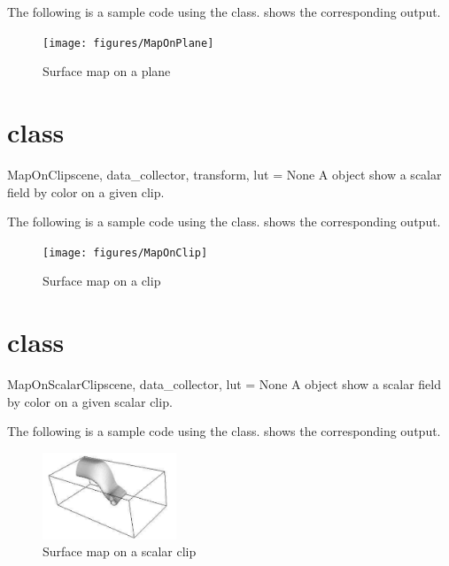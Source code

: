 The following is a sample code using the \MapOnPlane class.
 shows the corresponding output. 


\begin{figure}[ht]
\begin{center}
\texttt{[image: figures/MapOnPlane]}
\end{center}
\caption{Surface map on a plane}
\label{fig:maponplane.1}
\end{figure}

\section{\MapOnClip class}
\begin{classdesc}{MapOnClip}{scene, data_collector, transform, lut = None}
A \MapOnClip object show a scalar field by color on a given clip.
\end{classdesc}

The following is a sample code using the \MapOnClip class. 
 shows the corresponding output. 


\begin{figure}[ht]
\begin{center}
\texttt{[image: figures/MapOnClip]}
\end{center}
\caption{Surface map on a clip}
\label{fig:maponclip.1}
\end{figure}

\section{\MapOnScalarClip class}
\begin{classdesc}{MapOnScalarClip}{scene, data_collector, lut = None}
A \MapOnScalarClip object show a scalar field by color on a given scalar clip.
\end{classdesc}

The following is a sample code using the \MapOnScalarClip class.
 shows the corresponding output.


\begin{figure}[ht]
\begin{center}
\includegraphics[width=40mm]{figures/MapOnScalarClip}
\end{center}
\caption{Surface map on a scalar clip}
\label{fig:maponscalarclip.1}
\end{figure}

